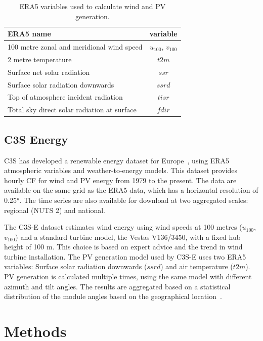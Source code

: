 \documentclass[a4paper, 11pt]{article}
\begin{document}
\begin{table}[h!]
	\centering
	\begin{tabular}{|l|c|}
		\hline
		{\textbf{ERA5 name}}      & \textbf{variable} \\ \hline
		100 metre zonal and meridional wind speed   & $u_{100}$, $v_{100}$ \\
		2 metre temperature                         & $t2m$ \\
		Surface net solar radiation                 & $ssr$ \\
		Surface solar radiation downwards           & $ssrd$  \\
		Top of atmosphere incident radiation        & $tisr$  \\
		Total sky direct solar radiation at surface & $fdir$  \\ \hline
	\end{tabular}
	\caption{ERA5 variables used to calculate wind and PV generation.}
	\label{tab:var_name}
\end{table}

\subsection{C3S Energy}
\label{sec:c3se}

C3S has developed a renewable energy dataset for Europe~\cite{dubus2023energy}, using ERA5 atmospheric variables and weather-to-energy models. This dataset provides hourly CF for wind and PV energy from 1979 to the present. The data are available on the same grid as the ERA5 data, which has a horizontal resolution of 0.25°. The time series are also available for download at two aggregated scales: regional (NUTS 2) and national.

The C3S-E dataset estimates wind energy using wind speeds at 100 metres ($u_{100}$, $v_{100}$) and a standard turbine model, the Vestas V136/3450, with a fixed hub height of 100 m. This choice is based on expert advice and the trend in wind turbine installation. The PV generation model used by C3S-E uses two ERA5 variables: Surface solar radiation downwards ($ssrd$) and air temperature ($t2m$). PV generation is calculated multiple times, using the same model with different azimuth and tilt angles. The results are aggregated based on a statistical distribution of the module angles based on the geographical location~\cite{saintdrenan2018solar}.

\section{Methods}
\label{sec:Methods}
\end{document}
